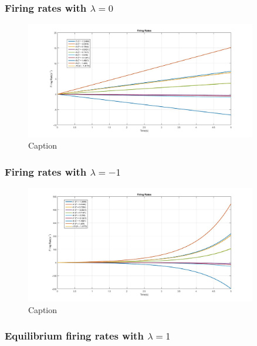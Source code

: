 \documentclass{article}
\begin{document}
	\subsubsection{Firing rates with $\lambda = 0$}

	\begin{figure}[H] 
		\begin{center}
			\includegraphics[width=0.9\textwidth]{Section1/Part1/Q1b.jpg}
			\caption{Caption \label{Q1b}}
		\end{center}
	\end{figure}
	
	\subsubsection{Firing rates with $\lambda = -1$}
	
	\begin{figure}[H] 
		\begin{center}
			\includegraphics[width=0.9\textwidth]{Section1/Part1/Q1c.jpg}
			\caption{Caption \label{Q1c}}
		\end{center}
	\end{figure}
	
	\subsubsection{Equilibrium firing rates with $\lambda = 1$}
	
\end{document}
